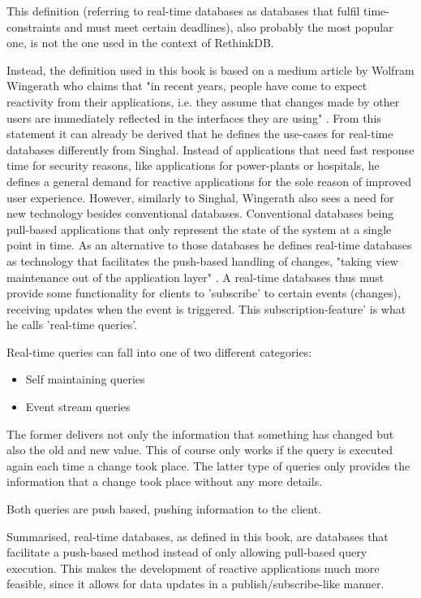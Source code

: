 This definition (referring to real-time databases as databases that fulfil time-constraints and must meet certain deadlines), also probably the most popular one, is not the one used in the context of RethinkDB.


Instead, the definition used in this book is based on a medium article by Wolfram Wingerath \autocite{Wingerath2017} who claims that "in recent years, people have come to expect reactivity from their applications, i.e. they assume that changes made by other users are immediately reflected in the interfaces they are using" \autocite{Wingerath2017}. From this statement it can already be derived that he defines the use-cases for real-time databases differently from Singhal. Instead of applications that need fast response time for security reasons, like applications for power-plants or hospitals, he defines a general demand for reactive applications for the sole reason of improved user experience. However, similarly to Singhal, Wingerath also sees a need for new technology besides conventional databases. Conventional databases being pull-based applications that only represent the state of the system at a single point in time. As an alternative to those databases he defines real-time databases as technology that facilitates the push-based handling of changes, "taking view maintenance out of the application layer" \autocite{Wingerath2017}. A real-time databases thus must provide some functionality for clients to 'subscribe' to certain events (changes), receiving updates when the event is triggered. This subscription-feature' is what he calls 'real-time queries'.


Real-time queries can fall into one of two different categories:

\begin{itemize}
    \item Self maintaining queries
    \item Event stream queries
\end{itemize}

The former delivers not only the information that something has changed but also the old and new value. This of course only works if the query is executed again each time a change took place. The latter type of queries only provides the information that a change took place without any more details.


Both queries are push based, pushing information to the client.


Summarised, real-time databases, as defined in this book, are databases that facilitate a push-based method instead of only allowing pull-based query execution. This makes the development of reactive applications much more feasible, since it allows for data updates in a publish/subscribe-like manner.

